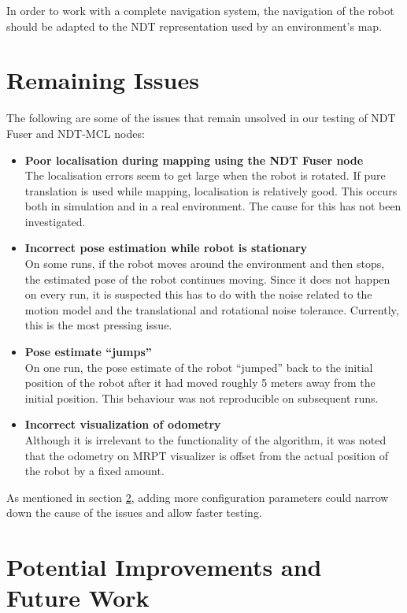 \documentclass[12pt]{article}
\begin{document}
	In order to work with a complete navigation system, the navigation of the robot should be adapted to the NDT representation used by an environment's map.
	
	\section{Remaining Issues}
	\label{sec:remainingIssues}
	
	The following are some of the issues that remain unsolved in our testing of NDT Fuser and NDT-MCL nodes:
	\begin{itemize}
		\item \textbf{Poor localisation during mapping using the NDT Fuser node}\\
		The localisation errors seem to get large when the robot is rotated. If pure translation is used while mapping, localisation is relatively good. This occurs both in simulation and in a real environment. The cause for this has not been investigated.
		\item \textbf{Incorrect pose estimation while robot is stationary}\\
		On some runs, if the robot moves around the environment and then stops, the estimated pose of the robot continues moving. Since it does not happen on every run, it is suspected this has to do with the noise related to the motion model and the translational and rotational noise tolerance. Currently, this is the most pressing issue.
		\item \textbf{Pose estimate ``jumps''}\\
		On one run, the pose estimate of the robot ``jumped'' back to the initial position of the robot after it had moved roughly 5 meters away from the initial position. This behaviour was not reproducible on subsequent runs.
		\item \textbf{Incorrect visualization of odometry}\\
		Although it is irrelevant to the functionality of the algorithm, it was noted that the odometry on MRPT visualizer is offset from the actual position of the robot by a fixed amount.	
	\end{itemize}  
	As mentioned in section \ref{sec:potentialImprovements}, adding more configuration parameters could narrow down the cause of the issues and allow faster testing.
	
	\section{Potential Improvements and Future Work}
	\label{sec:potentialImprovements}
	
\end{document}
